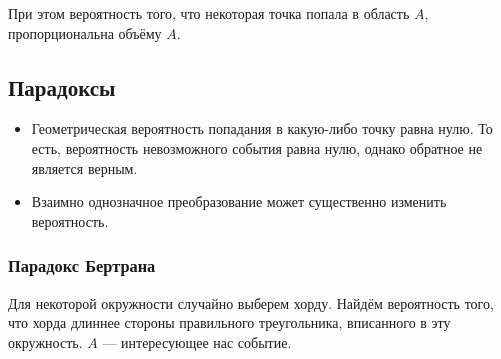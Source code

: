При этом вероятность того, что некоторая точка попала в область $A$, пропорциональна объёму $A$.
\subsection{Парадоксы}
\begin{itemize}
  \item Геометрическая вероятность попадания в какую-либо точку равна нулю.
  То есть, вероятность невозможного события равна нулю, однако обратное не является верным.
  \item Взаимно однозначное преобразование может существенно изменить вероятность.
\end{itemize}
\subsubsection{Парадокс Бертрана}
Для некоторой окружности случайно выберем хорду. Найдём вероятность того, что хорда длиннее стороны правильного треугольника, вписанного в эту окружность. $A$ --- интересующее нас событие.
